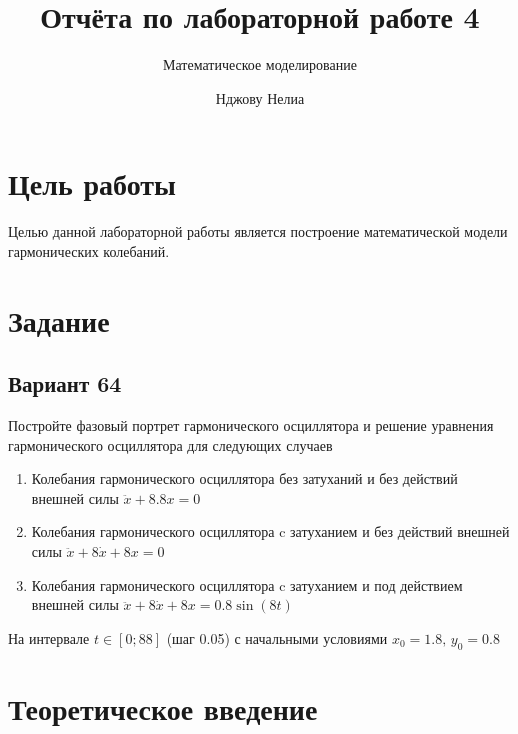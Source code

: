 \documentclass[
  12pt,
  a4paper,
  DIV=11,
  numbers=noendperiod]{scrreprt}
\title{Отчёта по лабораторной работе 4}
\subtitle{Математическое моделирование}
\author{Нджову Нелиа}
\date{}
\renewcommand*\contentsname{Содержание}
\newcommand\contentsname{Содержание}
\begin{document}
\maketitle

\renewcommand*\contentsname{Содержание}
{
\setcounter{tocdepth}{1}
\tableofcontents
}
\listoffigures
\listoftables
{}
\chapter{Цель
работы}\label{ux446ux435ux43bux44c-ux440ux430ux431ux43eux442ux44b}

Целью данной лабораторной работы является построение математической
модели гармонических колебаний.

\chapter{Задание}\label{ux437ux430ux434ux430ux43dux438ux435}

\section{Вариант 64}\label{ux432ux430ux440ux438ux430ux43dux442-64}

Постройте фазовый портрет гармонического осциллятора и решение уравнения
гармонического осциллятора для следующих случаев

\begin{enumerate}
\def\labelenumi{\arabic{enumi}.}
\item
  Колебания гармонического осциллятора без затуханий и без действий
  внешней силы \(\ddot{x} + 8.8x = 0\)
\item
  Колебания гармонического осциллятора c затуханием и без действий
  внешней силы \(\ddot{x} + 8\dot{x} + 8x = 0\)
\item
  Колебания гармонического осциллятора c затуханием и под действием
  внешней силы \(\ddot{x} + 8\dot{x} + 8x = 0.8\sin(8t)\)
\end{enumerate}

На интервале \(t \in [0; 88]\) (шаг 0.05) с начальными условиями
\(x_0 = 1.8,\,y_0 = 0.8\)

\chapter{Теоретическое
введение}\label{ux442ux435ux43eux440ux435ux442ux438ux447ux435ux441ux43aux43eux435-ux432ux432ux435ux434ux435ux43dux438ux435}
\end{document}
